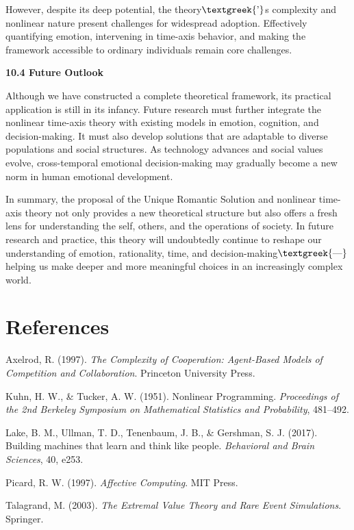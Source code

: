\documentclass[a4paper]{article}
\begin{document}
However, despite its deep potential, the theory$\text{\textgreek{’}}$s complexity and nonlinear nature present
challenges for widespread adoption. Effectively quantifying emotion, intervening in time-axis behavior, and making the
framework accessible to ordinary individuals remain core challenges.

\textbf{10.4 Future Outlook}

Although we have constructed a complete theoretical framework, its practical application is still in its infancy. Future
research must further integrate the nonlinear time-axis theory with existing models in emotion, cognition, and
decision-making. It must also develop solutions that are adaptable to diverse populations and social structures. As
technology advances and social values evolve, cross-temporal emotional decision-making may gradually become a new norm
in human emotional development.

In summary, the proposal of the Unique Romantic Solution and nonlinear time-axis theory not only provides a new
theoretical structure but also offers a fresh lens for understanding the self, others, and the operations of society.
In future research and practice, this theory will undoubtedly continue to reshape our understanding of emotion,
rationality, time, and decision-making$\text{\textgreek{—}}$helping us make deeper and more meaningful choices in an
increasingly complex world.


\bigskip


\bigskip


\bigskip


\bigskip

\clearpage\section{References}
Axelrod, R. (1997). \textit{The Complexity of Cooperation: Agent-Based Models of Competition and Collaboration}.
Princeton University Press.

Kuhn, H. W., \& Tucker, A. W. (1951). Nonlinear Programming. \textit{Proceedings of the 2nd Berkeley Symposium on
Mathematical Statistics and Probability}, 481–492.

Lake, B. M., Ullman, T. D., Tenenbaum, J. B., \& Gershman, S. J. (2017). Building machines that learn and think like
people. \textit{Behavioral and Brain Sciences}, 40, e253.

Picard, R. W. (1997). \textit{Affective Computing}. MIT Press.

Talagrand, M. (2003). \textit{The Extremal Value Theory and Rare Event Simulations}. Springer.
\end{document}
